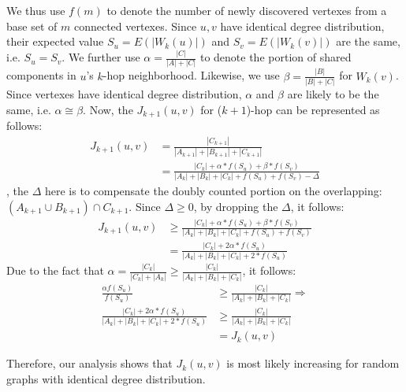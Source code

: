 We thus use $f(m)$ to denote the number of newly discovered vertexes
from a base set of $m$ connected vertexes. Since $u,v$ have 
identical degree distribution, their expected value $S_u=E(|W_k(u)|)$
and $S_v=E(|W_k(v)|)$ are the same, i.e. $S_u = S_v$.
We further use $\alpha = \frac{|C|}{|A|+|C|}$ to denote the portion of shared
components in $u$'s $k$-hop neighborhood. Likewise, we use $\beta = \frac{|B|}{|B|+|C|}$ for 
$W_k(v)$. Since vertexes have identical degree distribution, $\alpha$ and $\beta$ are likely
to be the same, i.e. $\alpha \cong \beta$.
Now, the $J_{k+1}(u,v)$ for ($k+1$)-hop can be represented as follows:
\begin{equation}
\begin{split}
J_{k+1}(u,v) & = \frac{|C_{k+1}|}{|A_{k+1}| + |B_{k+1}| + |C_{k+1}|} \\
	& = \frac{|C_k| + \alpha * f(S_u) + \beta * f(S_v)}{|A_k| +|B_k| +|C_k| +f(S_u) +  f(S_v) -\Delta} 
\end{split}
\end{equation}
, the $\Delta$ here is to compensate the doubly counted portion on the
overlapping: $(A_{k+1} \cup B_{k+1}) \cap C_{k+1}$. Since $\Delta \geq 0$, by dropping the $\Delta$, it  follows:
\begin{equation}
\begin{split}
J_{k+1}(u,v) & \geq \frac{|C_k| + \alpha * f(S_u) + \beta * f(S_v)}{|A_k| +|B_k| +|C_k| +f(S_u) +  f(S_v)}  \\
		& = \frac{|C_k| + 2\alpha * f(S_u)}{|A_k|+|B_k|+|C_k| + 2 * f(S_u)}
\end{split}
\end{equation}
Due to the fact that $\alpha = \frac{|C_k|}{|C_k|+|A_k|} \geq \frac{|C_k|}{|A_k|+|B_k|+|C_k|}$, it follows:
\begin{equation}
\begin{split}
	\frac{\alpha f(S_u)}{f(S_u)} & \geq \frac{|C_k|}{|A_k|+|B_k|+|C_k|} \Rightarrow \\
	\frac{|C_k| + 2\alpha * f(S_u)}{|A_k|+|B_k|+|C_k| + 2 * f(S_u)} & \geq \frac{|C_k|}{|A_k|+|B_k|+|C_k|} \\
	& = J_k(u,v)
\end{split}
\end{equation}

Therefore, our analysis shows that $J_k(u,v)$ is most likely increasing for random graphs with identical
degree distribution.


